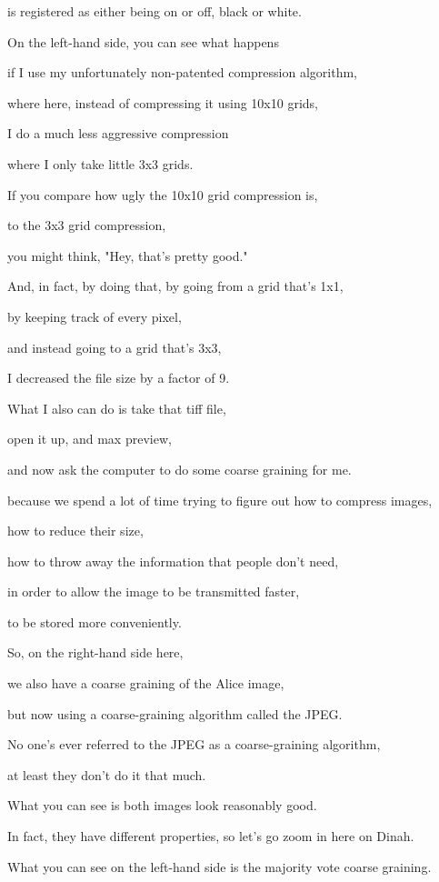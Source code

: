 \documentclass[]{article}
\begin{document}
is registered as either being
on or off, black or white.

On the left-hand side,
you can see what happens

if I use my unfortunately non-patented
compression algorithm,

where here, instead of compressing it
using 10x10 grids,

I do a much less aggressive compression

where I only take little 3x3 grids.

If you compare how ugly
the 10x10 grid compression is,

to the 3x3 grid compression,

you might think,
"Hey, that's pretty good."

And, in fact, by doing that,
by going from a grid that's 1x1,

by keeping track of every pixel,

and instead going to a grid that's 3x3,

I decreased the file size
by a factor of 9.

What I also can do is take that tiff file,

open it up, and max preview,

and now ask the computer
to do some coarse graining for me.

because we spend a lot of time trying
to figure out how to compress images,

how to reduce their size,

how to throw away the information
that people don't need,

in order to allow the image
to be transmitted faster,

to be stored more conveniently.

So, on the right-hand side here,

we also have a coarse graining
of the Alice image,

but now using a coarse-graining algorithm
called the JPEG.

No one's ever referred to the JPEG
as a coarse-graining algorithm,

at least they don't do it that much.

What you can see is both images
look reasonably good.

In fact, they have different properties,
so let's go zoom in here on Dinah.

What you can see on the left-hand side
is the majority vote coarse graining.
\end{document}

